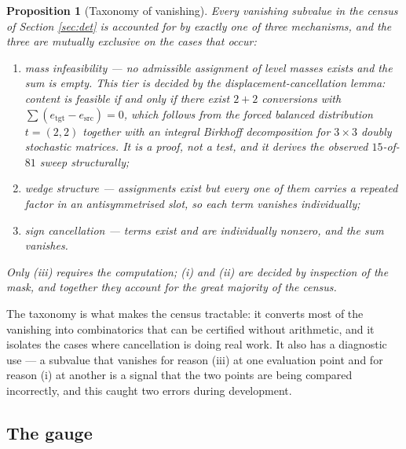 \documentclass[11pt,reqno]{amsart}
\theoremstyle{plain}
\newtheorem{proposition}[theorem]{Proposition}
\theoremstyle{definition}
\begin{document}
\begin{proposition}[Taxonomy of vanishing]\label{prop:taxonomy}
Every vanishing subvalue in the census of Section \ref{sec:det} is accounted
for by exactly one of three mechanisms, and the three are mutually exclusive on
the cases that occur:
\begin{enumerate}
\item[(i)] \emph{mass infeasibility} --- no admissible assignment of level
masses exists and the sum is empty.  This tier is decided by the
\emph{displacement-cancellation lemma}: content is feasible if and only if
there exist $2+2$ conversions with $\sum(e_{\mathrm{tgt}}-e_{\mathrm{src}})=0$,
which follows from the forced balanced distribution $t=(2,2)$ together with an
integral Birkhoff decomposition for $3\times3$ doubly stochastic matrices.  It
is a proof, not a test, and it derives the observed $15$-of-$81$ sweep
structurally;
\item[(ii)] \emph{wedge structure} --- assignments exist but every one of them
carries a repeated factor in an antisymmetrised slot, so each term vanishes
individually;
\item[(iii)] \emph{sign cancellation} --- terms exist and are individually
nonzero, and the sum vanishes.
\end{enumerate}
Only (iii) requires the computation; (i) and (ii) are decided by inspection of
the mask, and together they account for the great majority of the census.
\end{proposition}

The taxonomy is what makes the census tractable: it converts most of the
vanishing into combinatorics that can be certified without arithmetic, and it
isolates the cases where cancellation is doing real work.  It also has a
diagnostic use --- a subvalue that vanishes for reason (iii) at one evaluation
point and for reason (i) at another is a signal that the two points are being
compared incorrectly, and this caught two errors during development.

\subsection*{The gauge}
\end{document}
